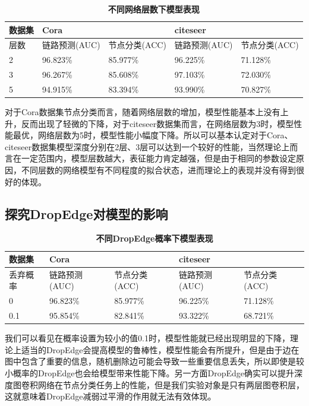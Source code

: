 \documentclass{article}
\begin{document}
	\begin{table}[!ht]
		\caption{\textbf{不同网络层数下模型表现}}%
		\centering%
		\begin{tabular}{|l|ll|ll|}
			\hline
			数据集 & \multicolumn{2}{l|}{Cora} & \multicolumn{2}{l|}{citeseer} \\ \hline
			层数  & 链路预测(AUC)   & 节点分类(ACC)   & 链路预测(AUC)     & 节点分类(ACC)     \\ \hline
			2   &  96.823\%       &   85.977\%     & 96.225\%             & 71.128\%              \\
			3   &  96.267\%       &  85.608\%      & 97.103\%             & 72.030\%              \\
			5   &  94.915\%       &  83.394\%      & 93.990\%             & 70.827\%          \\ \hline
		\end{tabular}
	\end{table}
	对于Cora数据集节点分类而言，随着网络层数的增加，模型性能基本上没有上升，反而出现了轻微的下降，对于citeseer数据集而言，在网络层数为3时，模型性能最优，网络层数为5时，模型性能小幅度下降。所以可以基本认定对于Cora、citeseer数据集模型深度分别在2层、3层可以达到一个较好的性能，当然理论上而言在一定范围内，模型层数越大，表征能力肯定越强，但是由于相同的参数设定原因，不同层数的网络模型有不同程度的拟合状态，进而理论上的表现并没有得到很好的体现。
	
	\subsection{探究DropEdge对模型的影响}
	
	\begin{table}[!ht]
		\caption{\textbf{不同DropEdge概率下模型表现}}%
		\centering%
		\begin{tabular}{|l|ll|ll|}
			\hline
			数据集 & \multicolumn{2}{l|}{Cora} & \multicolumn{2}{l|}{citeseer} \\ \hline
			丢弃概率  & 链路预测(AUC)   & 节点分类(ACC)   & 链路预测(AUC)     & 节点分类(ACC)     \\ \hline
			0   &  96.823\%       &   85.977\%     & 96.225\%             & 71.128\%              \\
			0.1   &  95.854\%       &  82.841\%      & 93.322\%             & 68.721\%              \\ \hline 
		\end{tabular}
	\end{table}
	我们可以看见在概率设置为较小的值0.1时，模型性能就已经出现明显的下降，理论上适当的DropEdge会提高模型的鲁棒性，模型性能会有所提升，但是由于边在图中包含了重要的信息，随机删除边可能会导致一些重要信息丢失，所以即使是较小概率的DropEdge也会给模型带来性能下降。另一方面DropEdge确实可以提升深度图卷积网络在节点分类任务上的性能，但是我们实验对象是只有两层图卷积层，这就意味着DropEdge减弱过平滑的作用就无法有效体现。
	
\end{document}
